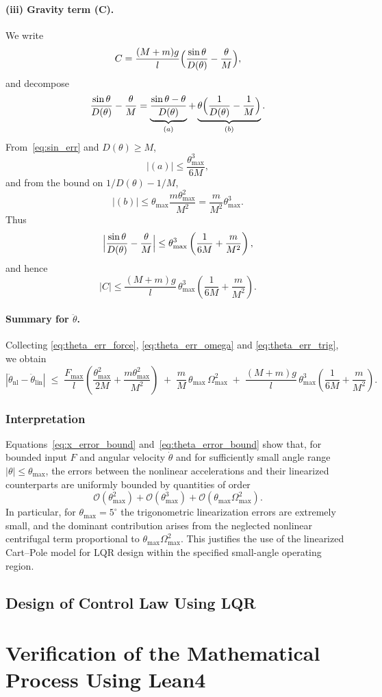 \documentclass{article}
\begin{document}
\paragraph*{(iii) Gravity term (C).}
We write
\[
C = \frac{(M+m) g}{l}
\Bigl(\frac{\sin\theta}{D(\theta)} - \frac{\theta}{M}\Bigr),
\]
and decompose
\[
\frac{\sin\theta}{D(\theta)} - \frac{\theta}{M}
=
\underbrace{\frac{\sin\theta - \theta}{D(\theta)}}_{(a)}
+
\underbrace{\theta\Bigl(\frac{1}{D(\theta)} - \frac{1}{M}\Bigr)}_{(b)}.
\]
From~\eqref{eq:sin_err} and $D(\theta)\ge M$,
\[
|(a)| \le \frac{\theta_{\max}^3}{6M},
\]
and from the bound on $1/D(\theta) - 1/M$,
\[
|(b)| \le \theta_{\max}\frac{m\theta_{\max}^2}{M^2}
= \frac{m}{M^2}\theta_{\max}^3.
\]
Thus
\[
\Bigl|\frac{\sin\theta}{D(\theta)} - \frac{\theta}{M}\Bigr|
\le \theta_{\max}^3\left(
\frac{1}{6M} + \frac{m}{M^2}
\right),
\]
and hence
\begin{equation}
|C|
\le
\frac{(M+m) g}{l}\,
\theta_{\max}^3\left(
\frac{1}{6M} + \frac{m}{M^2}
\right).
\label{eq:theta_err_trig}
\end{equation}

\paragraph*{Summary for $\ddot\theta$.}
Collecting \eqref{eq:theta_err_force}, \eqref{eq:theta_err_omega} and \eqref{eq:theta_err_trig}, we obtain
\begin{equation}
\boxed{
|\ddot\theta_{\mathrm{nl}} - \ddot\theta_{\mathrm{lin}}|
\;\le\;
\frac{F_{\max}}{l}\left(
\frac{\theta_{\max}^2}{2M} +
\frac{m\theta_{\max}^2}{M^2}
\right)
\;+\;
\frac{m}{M}\,\theta_{\max}\,\Omega_{\max}^2
\;+\;
\frac{(M+m) g}{l}\,
\theta_{\max}^3\left(
\frac{1}{6M} + \frac{m}{M^2}
\right).
}
\label{eq:theta_error_bound}
\end{equation}

\subsubsection*{Interpretation}

Equations~\eqref{eq:x_error_bound} and~\eqref{eq:theta_error_bound} show that, for bounded input $F$ and angular velocity $\dot\theta$ and for sufficiently small angle range $|\theta|\le\theta_{\max}$, the errors between the nonlinear accelerations and their linearized counterparts are uniformly bounded by quantities of order
\[
\mathcal{O}(\theta_{\max}^2) + \mathcal{O}(\theta_{\max}^3)
 + \mathcal{O}(\theta_{\max}\Omega_{\max}^2).
\]
In particular, for $\theta_{\max} = 5^\circ$ the trigonometric linearization errors are extremely small, and the dominant contribution arises from the neglected nonlinear centrifugal term proportional to $\theta_{\max}\Omega_{\max}^2$. This justifies the use of the linearized Cart--Pole model for LQR design within the specified small-angle operating region.

\subsection{Design of Control Law Using LQR}


\section{Verification of the Mathematical Process Using Lean4}



\end{document}

